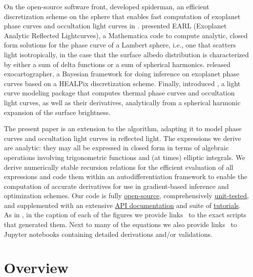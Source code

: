 \documentclass[modern]{aastex62}
\begin{document}
On the open-source software front, \citet{Louden2018} developed
\textsf{spiderman}, an efficient discretization scheme
on the sphere that enables fast computation of exoplanet
phase curves and occultation light curves in \Python.
%
\citet{Haggard2018} presented
\textsf{EARL} (Exoplanet Analytic Reflected Lightcurves),
a \textsf{Mathematica} code to compute analytic, closed form
solutions for the phase curve of a Lambert sphere, i.e., one that
scatters light isotropically, in the case that the surface albedo
distribution is characterized by either a sum of delta functions
or a sum of spherical harmonics.
%
\citet{Farr2018} released \textsf{exocartographer}, a Bayesian
framework for doing inference on exoplanet phase curves based on
a HEALPix \citep{healpix} discretization scheme.
%
Finally, \citet{Luger2019} introduced \starry, a light curve
modeling package that computes thermal phase curves and occultation
light curves, as well as their derivatives, analytically from a spherical
harmonic expansion of the surface brightness.

The present paper is an extension to the \starry algorithm,
adapting it to model phase curves and occultation light curves
in reflected light. The expressions
we derive are analytic: they may all be expressed in closed form
in terms of algebraic operations involving trigonometric functions
and (at times) elliptic integrals. We derive numerically
stable recursion relations for the efficient evaluation of all
expressions and code them within an autodifferentiation framework
to enable the computation of accurate derivatives for use in
gradient-based inference and optimization schemes.
Our code is fully
\href{https://github.com/rodluger/starry}{open-source},
comprehensively
\href{https://dev.azure.com/rodluger/starry/_test/analytics?definitionId=4}{unit-tested},
and supplemented with an extensive
\href{https://rodluger.github.io/starry}{API documentation}
and suite of
\href{https://rodluger.github.io/starry/latest/tutorials.html}{tutorials}.
%
As in \citet{Luger2019}, in the caption of each of the figures
we provide links \codeicon\ to the exact \Python scripts that
generated them. Next to many of the equations we also provide
links \prooficon\ to \textsf{Jupyter} notebooks containing
detailed derivations and/or validations.

\section{Overview}
\label{sec:overview}
\end{document}
